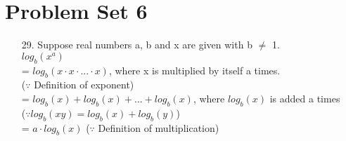 \documentclass[12pt]{article}
\begin{document}
\section*{Problem Set 6}
\begin{itemize}
    \item [29.]
        Suppose real numbers a, b and x are given with b $\neq$ 1. \\
        $log_b(x^a)$ \\
        = $log_b(x \cdot x \cdot ... \cdot x)$, where x is multiplied by itself a times. \\
            ($\because$ Definition of exponent) \\
        = $log_b(x) + log_b(x) + ... + log_b(x)$, where $log_b(x)$ is added a times \\
            ($\because log_b(xy) = log_b(x) + log_b(y)$) \\
        = $a \cdot log_b(x)$ \hspace{6em} ($\because$ Definition of multiplication)
        
\end{itemize}
\end{document}
